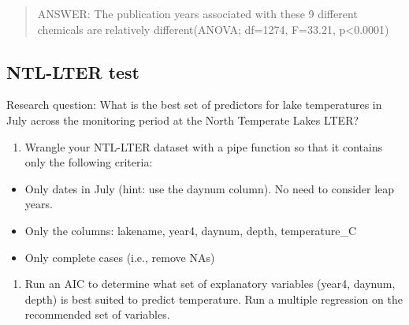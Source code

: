 \documentclass[]{article}
\newenvironment{Shaded}{\begin{snugshade}}{\end{snugshade}}
\newcommand{\KeywordTok}[1]{\textcolor[rgb]{0.13,0.29,0.53}{\textbf{#1}}}
\newcommand{\DataTypeTok}[1]{\textcolor[rgb]{0.13,0.29,0.53}{#1}}
\newcommand{\DecValTok}[1]{\textcolor[rgb]{0.00,0.00,0.81}{#1}}
\newcommand{\StringTok}[1]{\textcolor[rgb]{0.31,0.60,0.02}{#1}}
\newcommand{\CommentTok}[1]{\textcolor[rgb]{0.56,0.35,0.01}{\textit{#1}}}
\newcommand{\OperatorTok}[1]{\textcolor[rgb]{0.81,0.36,0.00}{\textbf{#1}}}
\newcommand{\NormalTok}[1]{#1}
\providecommand{\tightlist}{%
  \setlength{\itemsep}{0pt}\setlength{\parskip}{0pt}}
\begin{document}
\begin{quote}
ANSWER: The publication years associated with these 9 different
chemicals are relatively different(ANOVA; df=1274, F=33.21,
p\textless{}0.0001)
\end{quote}

\subsection{NTL-LTER test}\label{ntl-lter-test}

Research question: What is the best set of predictors for lake
temperatures in July across the monitoring period at the North Temperate
Lakes LTER?

\begin{enumerate}
\def\labelenumi{\arabic{enumi}.}
\setcounter{enumi}{10}
\tightlist
\item
  Wrangle your NTL-LTER dataset with a pipe function so that it contains
  only the following criteria:
\end{enumerate}

\begin{itemize}
\tightlist
\item
  Only dates in July (hint: use the daynum column). No need to consider
  leap years.
\item
  Only the columns: lakename, year4, daynum, depth, temperature\_C
\item
  Only complete cases (i.e., remove NAs)
\end{itemize}

\begin{enumerate}
\def\labelenumi{\arabic{enumi}.}
\setcounter{enumi}{11}
\tightlist
\item
  Run an AIC to determine what set of explanatory variables (year4,
  daynum, depth) is best suited to predict temperature. Run a multiple
  regression on the recommended set of variables.
\end{enumerate}

\begin{Shaded}
\end{Shaded}
\end{document}
